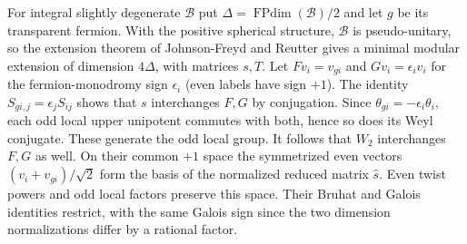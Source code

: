 \documentclass[11pt,a4paper]{article}
\numberwithin{equation}{section}
\theoremstyle{remark}
\newcommand{\FPdim}{\operatorname{FPdim}}
\begin{document}
For integral slightly degenerate $\mathcal B$ put $\Delta=\FPdim(\mathcal B)/2$ and let $g$ be its transparent fermion. With the positive spherical structure, $\mathcal B$ is pseudo-unitary, so the extension theorem of Johnson-Freyd and Reutter \cite[Corollary~1.3]{JFR} gives a minimal modular extension of dimension $4\Delta$, with matrices $s,T$. Let $Fv_i=v_{gi}$ and $Gv_i=\epsilon_i v_i$ for the fermion-monodromy sign $\epsilon_i$ (even labels have sign $+1$). The identity $S_{gi,j}=\epsilon_jS_{ij}$ shows that $s$ interchanges $F,G$ by conjugation. Since $\theta_{gi}=-\epsilon_i\theta_i$, each odd local upper unipotent commutes with both, hence so does its Weyl conjugate. These generate the odd local group. It follows that $W_2$ interchanges $F,G$ as well. On their common $+1$ space the symmetrized even vectors $(v_i+v_{gi})/\sqrt2$ form the basis of the normalized reduced matrix $\widehat s$. Even twist powers and odd local factors preserve this space. Their Bruhat and Galois identities restrict, with the same Galois sign since the two dimension normalizations differ by a rational factor.
\end{document}
